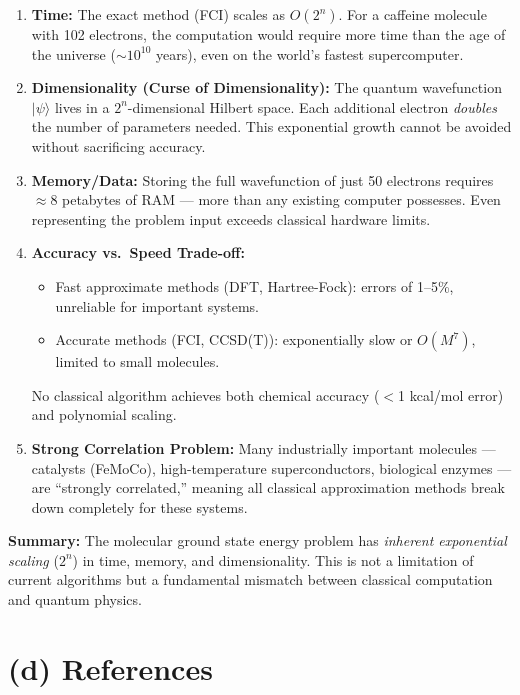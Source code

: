 \documentclass[11pt]{article}
\begin{document}
\begin{enumerate}
    \item \textbf{Time:} The exact method (FCI) scales as $O(2^n)$. For a caffeine molecule with 102 electrons, the computation would require more time than the age of the universe ($\sim 10^{10}$ years), even on the world's fastest supercomputer.
    
    \item \textbf{Dimensionality (Curse of Dimensionality):} The quantum wavefunction $|\psi\rangle$ lives in a $2^n$-dimensional Hilbert space. Each additional electron \textit{doubles} the number of parameters needed. This exponential growth cannot be avoided without sacrificing accuracy.
    
    \item \textbf{Memory/Data:} Storing the full wavefunction of just 50 electrons requires $\approx$8 petabytes of RAM --- more than any existing computer possesses. Even representing the problem input exceeds classical hardware limits.
    
    \item \textbf{Accuracy vs.\ Speed Trade-off:}
    \begin{itemize}
        \item Fast approximate methods (DFT, Hartree-Fock): errors of 1--5\%, unreliable for important systems.
        \item Accurate methods (FCI, CCSD(T)): exponentially slow or $O(M^7)$, limited to small molecules.
    \end{itemize}
    No classical algorithm achieves both chemical accuracy ($<$1 kcal/mol error) and polynomial scaling.
    
    \item \textbf{Strong Correlation Problem:} Many industrially important molecules --- catalysts (FeMoCo), high-temperature superconductors, biological enzymes --- are ``strongly correlated,'' meaning all classical approximation methods break down completely for these systems.
\end{enumerate}

\vspace{6pt}
\textbf{Summary:} The molecular ground state energy problem has \textit{inherent exponential scaling} ($2^n$) in time, memory, and dimensionality. This is not a limitation of current algorithms but a fundamental mismatch between classical computation and quantum physics.

\section*{(d) References}
\end{document}
